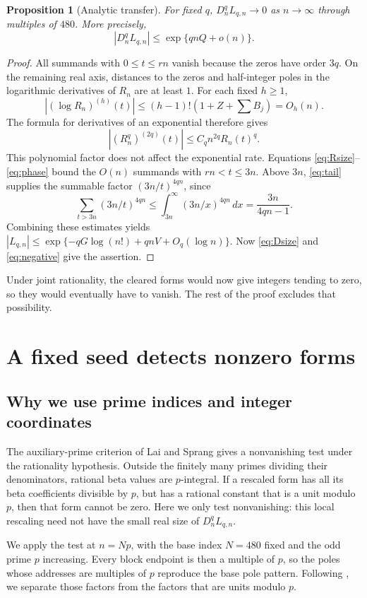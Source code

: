 \documentclass[11pt]{article}
\newtheorem{proposition}[theorem]{Proposition}
\begin{document}
\begin{proposition}[Analytic transfer]\label{prop:decay}
For fixed $q$, $D_n^qL_{q,n}\longrightarrow0$ as $n\longrightarrow\infty$
through multiples of $480$. More precisely,
\[
 |D_n^qL_{q,n}|\le\exp\{qnQ+o(n)\}.
\]
\end{proposition}
\begin{proof}
All summands with $0\le t\le rn$ vanish because the zeros have order
$3q$. On the remaining real axis, distances to the zeros and half-integer
poles in the logarithmic derivatives of $R_n$ are at least $1$.
For each fixed $h\ge1$,
\[
 |(\log R_n)^{(h)}(t)|\le(h-1)!(1+Z+\sum B_j)=O_h(n).
\]
The formula for derivatives of an exponential therefore gives
\[
 |(R_n^q)^{(2q)}(t)|\le C_qn^{2q}R_n(t)^q.
\]
This polynomial factor does not affect the exponential rate.
Equations \eqref{eq:Rsize}--\eqref{eq:phase} bound the $O(n)$ summands
with $rn<t\le3n$. Above $3n$, \eqref{eq:tail} supplies the summable factor
$(3n/t)^{4qn}$, since
\[
 \sum_{t>3n}(3n/t)^{4qn}
       \le\int_{3n}^{\infty}(3n/x)^{4qn}\,dx
       =\frac{3n}{4qn-1}.
\]
Combining these estimates yields
$|L_{q,n}|\le\exp\{-qG\log(n!)+qnV+O_q(\log n)\}$.
Now \eqref{eq:Dsize} and \eqref{eq:negative} give the assertion.
\end{proof}

Under joint rationality, the cleared forms would now give integers
tending to zero, so they would eventually have to vanish. The rest of
the proof excludes that possibility.

\section{A fixed seed detects nonzero forms}\label{sec:dilation}
\subsection{Why we use prime indices and integer coordinates}
The auxiliary-prime criterion of Lai and Sprang
\cite[Lemma 2.3]{laisprang} gives a nonvanishing test under the rationality
hypothesis. Outside the finitely many primes
dividing their denominators, rational beta values are $p$-integral.
If a rescaled form has all its beta coefficients divisible by $p$, but
has a rational constant that is a unit modulo $p$, then that form cannot
be zero. Here we only test nonvanishing: this local rescaling need not
have the small real size of $D_n^qL_{q,n}$.

We apply the test at $n=Np$, with the base index $N=480$ fixed and the odd
prime $p$ increasing. Every block endpoint is then a multiple of $p$,
so the poles whose addresses are multiples of $p$ reproduce the base
pole pattern. Following \cite[Section 6]{shifted}, we separate those
factors from the factors that are units modulo $p$.
\end{document}
